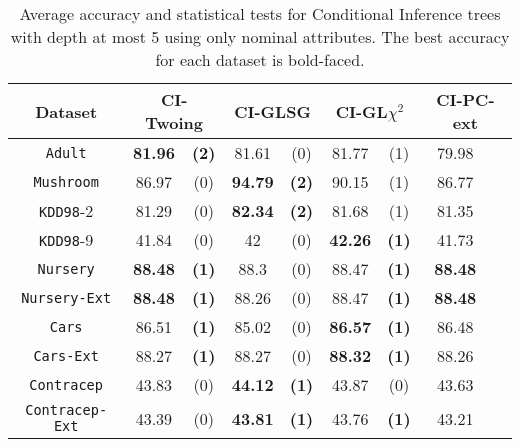 \begin{table*}
\small
\centering
    \caption{Average accuracy and statistical tests  for  Conditional Inference trees 
with depth at most 5 using only nominal attributes. The best accuracy for each dataset is bold-faced.}
\label{tab:CrossValCTree}
\begin{tabular}{c|cc|cc|cc|cc} 
Dataset  &   \multicolumn{2}{c|}{CI-Twoing} &   \multicolumn{2}{c|}{CI-GLSG} & \multicolumn{2}{c|}{CI-GL$\chi^2$}& \multicolumn{2}{c}{CI-PC-ext} \\  \hline   
{\tt Adult}        &{\bf 81.96} &{\bf  (2)} & 81.61       & (0)       & 81.77       & (1)       & 79.98       &           \\
{\tt Mushroom}     &86.97       & (0)       &{\bf  94.79 }& {\bf (2)} & 90.15       & (1)       & 86.77       &           \\
{\tt KDD98}-2      &81.29       & (0)       & {\bf 82.34 }& {\bf (2) }& 81.68       & (1)       & 81.35       &           \\
{\tt KDD98}-9      &41.84       & (0)       & 42          & (0)       & {\bf 42.26} & {\bf (1)} & 41.73       &           \\
{\tt Nursery}      &{\bf 88.48} & {\bf (1)} & 88.3        & (0)       & 88.47       & {\bf (1)} &{\bf 88.48 } &           \\
{\tt Nursery-Ext}  &{\bf 88.48} & {\bf (1)} & 88.26       & (0)       & 88.47       & {\bf (1)} &{\bf 88.48 } &           \\
{\tt Cars}         &86.51       & {\bf (1)} & 85.02       & (0)       & {\bf 86.57} & {\bf (1)} & 86.48       &           \\
{\tt Cars-Ext}     &88.27       & {\bf (1) }& 88.27       & (0)       & {\bf 88.32} & {\bf (1)} & 88.26       &           \\
{\tt Contracep}    &43.83       & (0)       & {\bf 44.12} & {\bf (1)} & 43.87       & (0)       & 43.63       &           \\
{\tt Contracep-Ext}&43.39       & (0)       & {\bf 43.81} & {\bf (1)} & 43.76       & {\bf (1)} & 43.21       &           \\

\end{tabular}
\end{table*}
